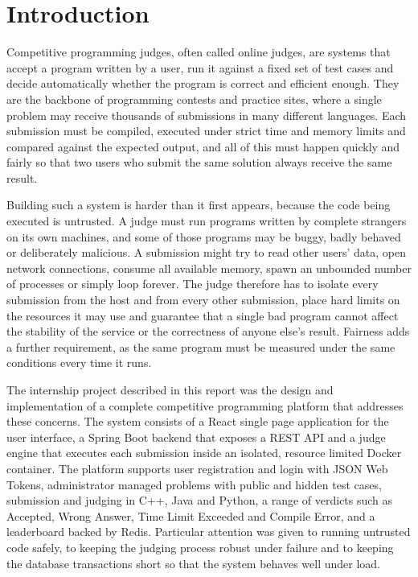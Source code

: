 \documentclass[12pt,a4paper]{report}
\begin{document}
\chapter*{Introduction}

Competitive programming judges, often called online judges, are systems that accept a program written by a user, run it against a fixed set of test cases and decide automatically whether the program is correct and efficient enough. They are the backbone of programming contests and practice sites, where a single problem may receive thousands of submissions in many different languages. Each submission must be compiled, executed under strict time and memory limits and compared against the expected output, and all of this must happen quickly and fairly so that two users who submit the same solution always receive the same result.

Building such a system is harder than it first appears, because the code being executed is untrusted. A judge must run programs written by complete strangers on its own machines, and some of those programs may be buggy, badly behaved or deliberately malicious. A submission might try to read other users' data, open network connections, consume all available memory, spawn an unbounded number of processes or simply loop forever. The judge therefore has to isolate every submission from the host and from every other submission, place hard limits on the resources it may use and guarantee that a single bad program cannot affect the stability of the service or the correctness of anyone else's result. Fairness adds a further requirement, as the same program must be measured under the same conditions every time it runs.

The internship project described in this report was the design and implementation of a complete competitive programming platform that addresses these concerns. The system consists of a React single page application for the user interface, a Spring Boot backend that exposes a REST API and a judge engine that executes each submission inside an isolated, resource limited Docker container. The platform supports user registration and login with JSON Web Tokens, administrator managed problems with public and hidden test cases, submission and judging in C++, Java and Python, a range of verdicts such as Accepted, Wrong Answer, Time Limit Exceeded and Compile Error, and a leaderboard backed by Redis. Particular attention was given to running untrusted code safely, to keeping the judging process robust under failure and to keeping the database transactions short so that the system behaves well under load.
\end{document}
